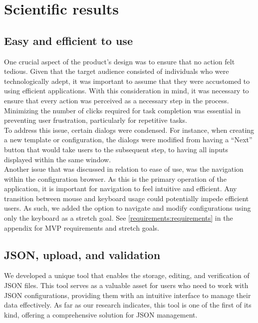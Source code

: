 \section{Scientific results}


\subsection{Easy and efficient to use}

One crucial aspect of the product’s design was to ensure that no action felt tedious. Given that the target audience consisted of individuals who were technologically adept, it was important to assume that they were accustomed to using efficient applications. With this consideration in mind, it was necessary to ensure that every action was perceived as a necessary step in the process. Minimizing the number of clicks required for task completion was essential in preventing user frustration, particularly for repetitive tasks. \\


\noindent
To address this issue, certain dialogs were condensed. For instance, when creating a new template or configuration, the dialogs were modified from having a “Next” button that would take users to the subsequent step, to having all inputs displayed within the same window. \\

\noindent
Another issue that was discussed in relation to ease of use, was the navigation within the configuration browser. As this is the primary operation of the application, it is important for navigation to feel intuitive and efficient. Any transition between mouse and keyboard usage could potentially impede efficient users. As such, we added the option to navigate and modify configurations using only the keyboard as a stretch goal. See \autoref{requirements:requirements} in the appendix for MVP requirements and stretch goals.

\subsection{JSON, upload, and validation}

We developed a unique tool that enables the storage, editing, and verification of JSON files. This tool serves as a valuable asset for users who need to work with JSON configurations, providing them with an intuitive interface to manage their data effectively. As far as our research indicates, this tool is one of the first of its kind, offering a comprehensive solution for JSON management. \\


